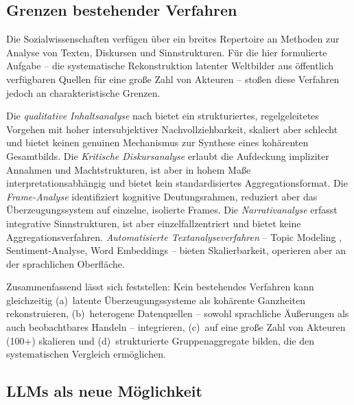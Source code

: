 \documentclass[11pt,a4paper]{article}
\theoremstyle{definition}
\theoremstyle{plain}
\theoremstyle{remark}
\begin{document}
\subsection{Grenzen bestehender Verfahren}
\label{sec:grenzen}

Die Sozialwissenschaften verf\"ugen \"uber ein breites Repertoire an Methoden zur Analyse von Texten, Diskursen und Sinnstrukturen. F\"ur die hier formulierte Aufgabe -- die systematische Rekonstruktion latenter Weltbilder aus \"offentlich verf\"ugbaren Quellen f\"ur eine gro\ss{}e Zahl von Akteuren -- sto\ss{}en diese Verfahren jedoch an charakteristische Grenzen.

Die \emph{qualitative Inhaltsanalyse} nach \citet{Mayring2022} bietet ein strukturiertes, regelgeleitetes Vorgehen mit hoher intersubjektiver Nachvollziehbarkeit, skaliert aber schlecht und bietet keinen genuinen Mechanismus zur Synthese eines koh\"arenten Gesamtbilds. Die \emph{Kritische Diskursanalyse} \citep{Fairclough1995} erlaubt die Aufdeckung impliziter Annahmen und Machtstrukturen, ist aber in hohem Ma\ss{}e interpretationsabh\"angig \citep{Breeze2011} und bietet kein standardisiertes Aggregationsformat. Die \emph{Frame-Analyse} \citep{Goffman1974, Entman1993} identifiziert kognitive Deutungsrahmen, reduziert aber das \"Uberzeugungssystem auf einzelne, isolierte Frames. Die \emph{Narrativanalyse} \citep{Riessman2008} erfasst integrative Sinnstrukturen, ist aber einzelfallzentriert und bietet keine Aggregationsverfahren. \emph{Automatisierte Textanalyseverfahren} -- Topic Modeling \citep{BleiNgJordan2003}, Sentiment-Analyse, Word Embeddings -- bieten Skalierbarkeit, operieren aber an der sprachlichen Oberfl\"ache.

Zusammenfassend l\"asst sich feststellen: Kein bestehendes Verfahren kann gleichzeitig (a)~latente \"Uberzeugungssysteme als koh\"arente Ganzheiten rekonstruieren, (b)~heterogene Datenquellen -- sowohl sprachliche \"Au\ss{}erungen als auch beobachtbares Handeln -- integrieren, (c)~auf eine gro\ss{}e Zahl von Akteuren (100+) skalieren und (d)~strukturierte Gruppenaggregate bilden, die den systematischen Vergleich erm\"oglichen.

\subsection{LLMs als neue M\"oglichkeit}
\label{sec:llms}
\end{document}
